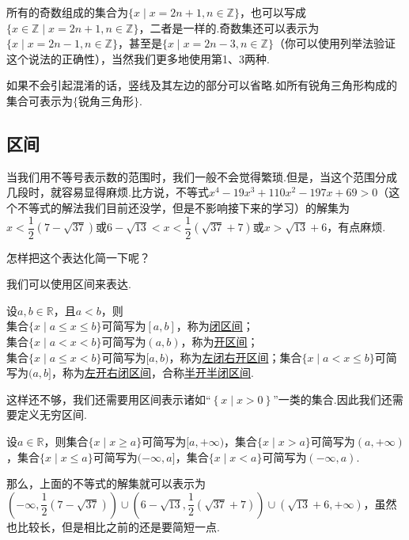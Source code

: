 \documentclass[lang=cn,math=cm,chinesefont=nofont,11pt,scheme=chinese,twocol]{elegantbook}
\begin{document}
\begin{example}
  \label{exp:1}
  所有的奇数组成的集合为$\{x\mid x=2n+1,n\in\mathbb{Z}\}$，也可以写成$\{x\in\mathbb{Z}\mid x=2n+1,n\in\mathbb{Z}\}$，二者是一样的.奇数集还可以表示为$\{x\mid x=2n-1,n\in\mathbb{Z}\}$，甚至是$\{x\mid x=2n-3,n\in\mathbb{Z}\}$（你可以使用列举法验证这个说法的正确性），当然我们更多地使用第1、3两种.
\end{example}

如果不会引起混淆的话，竖线及其左边的部分可以省略.如所有锐角三角形构成的集合可表示为$\{\text{锐角三角形}\}$.

\subsection{区间}
当我们用不等号表示数的范围时，我们一般不会觉得繁琐.但是，当这个范围分成几段时，就容易显得麻烦.比方说，不等式$x^4-19x^3+110x^2-197x+69>0$（这个不等式的解法我们目前还没学，但是不影响接下来的学习）的解集为$x<\dfrac{1}{2} \left(7-\sqrt{37}\right)\text{或}6-\sqrt{13}<x<\dfrac{1}{2} \left(\sqrt{37}+7\right)\text{或}x>\sqrt{13}+6$，有点麻烦.

怎样把这个表达化简一下呢？

我们可以使用区间来表达.

\begin{definition}[区间]
	设$a,b\in\mathbb{R}$，且$a<b$，则\\集合$\{x\mid a\leq x\leq b\}$可简写为$[a,b]$，称为\underline{闭区间}；\\集合$\{x\mid a<x<b\}$可简写为$(a,b)$，称为\underline{开区间}；\\集合$\{x\mid a\leq x<b\}$可简写为$[a,b)$，称为\underline{左闭右开区间}；集合$\{x\mid a< x\leq b\}$可简写为$(a,b]$，称为\underline{左开右闭区间}，合称\underline{半开半闭区间}.
\end{definition}

这样还不够，我们还需要用区间表示诸如“$\left\{x\mid x>0\right\}$”一类的集合.因此我们还需要定义无穷区间.

\begin{definition}[无穷区间]
    设$a\in\mathbb{R}$，则集合$\{x\mid x\geq a\}$可简写为$[a,+\infty)$，集合$\{x\mid x>a\}$可简写为$(a,+\infty)$，集合$\{x\mid x\leq a\}$可简写为$(-\infty,a]$，集合$\{x\mid x<a\}$可简写为$(-\infty,a)$.
\end{definition}

那么，上面的不等式的解集就可以表示为$(-\infty,\dfrac{1}{2} \left(7-\sqrt{37}\right))\cup (6-\sqrt{13},\dfrac{1}{2} \left(\sqrt{37}+7\right))\cup (\sqrt{13}+6,+\infty)$，虽然也比较长，但是相比之前的还是要简短一点.
\end{document}
